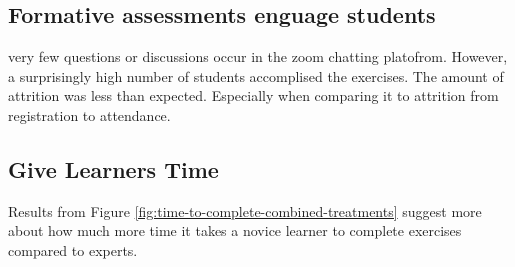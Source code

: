 \documentclass[040-assessment.tex]{subfiles}
\begin{document}
\subsection{}



\subsection{Formative assessments enguage students}

    very few questions or discussions occur in the zoom chatting platofrom.
    However, a surprisingly high number of students accomplised the exercises.
    The amount of attrition was less than expected.
    Especially when comparing it to attrition from registration to attendance.

\subsection{Give Learners Time}

    Results from Figure \ref{fig:time-to-complete-combined-treatments} suggest more about
    how much more time it takes a novice learner to complete exercises compared to experts.
\end{document}
